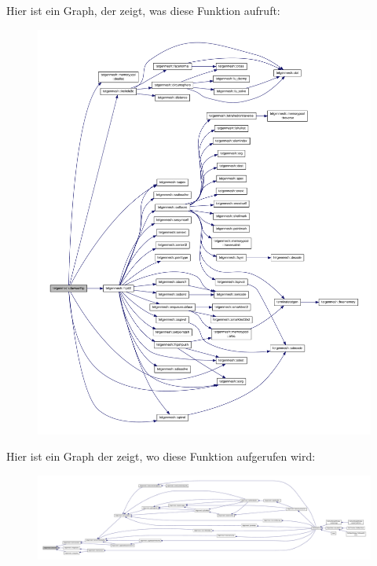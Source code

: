 Hier ist ein Graph, der zeigt, was diese Funktion aufruft\-:
\nopagebreak
\begin{figure}[H]
\begin{center}
\leavevmode
\includegraphics[width=350pt]{classtetgenmesh_acf60f3a43f8b907d95623b42a88ae968_cgraph}
\end{center}
\end{figure}




Hier ist ein Graph der zeigt, wo diese Funktion aufgerufen wird\-:
\nopagebreak
\begin{figure}[H]
\begin{center}
\leavevmode
\includegraphics[width=350pt]{classtetgenmesh_acf60f3a43f8b907d95623b42a88ae968_icgraph}
\end{center}
\end{figure}


